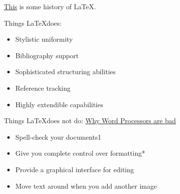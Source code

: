 \begin{frame}
  \href{https://www.tug.org/whatis.html}{This} is some history of \LaTeX.
\end{frame}

\begin{frame}
Things \LaTeX does:
\begin{itemize}
  \item Stylistic uniformity
  \item Bibliography support
  \item Sophisticated structuring abilities
  \item Reference tracking
  \item Highly extendible capabilities
\end{itemize}

\end{frame}

\begin{frame}
Things \LaTeX does not do:
  \href{https://web.archive.org/web/20211022153952/http://ricardo.ecn.wfu.edu/~cottrell/wp.html}{Why Word Processors are bad}
\begin{itemize}
  \item Spell-check your documents1
\item Give you complete control over formatting*
\item Provide a graphical interface for editing
\item Move text around when you add another image
\end{itemize}
\end{frame}

